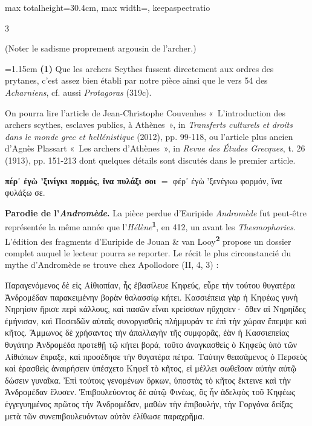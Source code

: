 \documentclass[11pt,twoside]{book}
\newcommand{\italique}[1]{\textit{#1}}
\newcommand{\citComm}[1]{\begin{quoting}[vskip=0.4pt,leftmargin=0.7em,rightmargin=0.2em]#1\end{quoting}}
\newcommand{\marqueur}[1]{\textsuperscript{\color{rubricRed}\textbf{#1}}}
\begin{document}
\begin{adjustbox}{max totalheight=30.4cm, max width=\textwidth, keepaspectratio}
\begin{minipage}{\textwidth}
{\begin{multicols}{3}
\par\vspace{1.5pt}
\noindent (Noter le sadisme proprement argousin de l'archer.)
\par\vspace{1.5pt}
\par\vspace{1.2pt}\par\nopagebreak\vspace{1pt}\noindent\hangindent=1.15em {\color{sepiaNote}\textbf{(1)}} Que les archers Scythes fussent directement aux ordres des prytanes, c'est assez bien établi par notre pièce ainsi que le vers 54 des \italique{Acharniens}, cf. aussi \italique{Protagoras} (319c).
\par\vspace{1.5pt}
\noindent On pourra lire l'article de Jean-Christophe Couvenhes «~L'introduction des archers scythes, esclaves publics, à Athènes~», in \italique{Transferts culturels et droits dans le monde grec et hellénistique} (2012), pp. 99-118, ou l'article plus ancien d'Agnès Plassart «~Les archers d'Athènes~», in \italique{Revue des Études Grecques}, t. 26 (1913), pp. 151-213 dont quelques détails sont discutés dans le premier article.
\par\vspace{1.5pt}
 \textbf{πέρ᾽ ἐγὼ 'ξινίγκι πορμός, ἴνα πυλάξι σοι} $=$ φέρ᾽ ἐγὼ 'ξενέγκω φορμόν, ἵνα φυλάξω σε.
\par\vspace{1.5pt}
 \textbf{Parodie de l'\italique{Andromède}.} La pièce perdue d'Euripide \italique{Andromède} fut peut-être représentée la même année que l'\italique{Hélène}\marqueur{1}, en 412, un avant les \italique{Thesmophories}. L'édition des fragments d'Euripide de Jouan \& van Looy\marqueur{2} propose un dossier complet auquel le lecteur pourra se reporter. Le récit le plus circonstancié du mythe d'Andromède se trouve chez Apollodore (II, 4, 3) :
\citComm{Παραγενόμενος δὲ εἰς Αἰθιοπίαν, ἧς ἐβασίλευε Κηφεύς, εὗρε τὴν τούτου θυγατέρα Ἀνδρομέδαν παρακειμένην βορὰν θαλασσίῳ κήτει. Κασσιέπεια γὰρ ἡ Κηφέως γυνὴ Νηρηίσιν ἤρισε περὶ κάλλους, καὶ πασῶν εἶναι κρείσσων ηὔχησεν· ὅθεν αἱ Νηρηίδες ἐμήνισαν, καὶ Ποσειδῶν αὐταῖς συνοργισθεὶς πλήμμυράν τε ἐπὶ τὴν χώραν ἔπεμψε καὶ κῆτος. Ἄμμωνος δὲ χρήσαντος τὴν ἀπαλλαγὴν τῆς συμφορᾶς, ἐὰν ἡ Κασσιεπείας θυγάτηρ Ἀνδρομέδα προτεθῇ τῷ κήτει βορά, τοῦτο ἀναγκασθεὶς ὁ Κηφεὺς ὑπὸ τῶν Αἰθιόπων ἔπραξε, καὶ προσέδησε τὴν θυγατέρα πέτρα. Ταύτην θεασάμενος ὁ Περσεὺς καὶ ἐρασθεὶς ἀναιρήσειν ὑπέσχετο Κηφεῖ τὸ κῆτος, εἰ μέλλει σωθεῖσαν αὐτὴν αὐτῷ δώσειν γυναῖκα. Ἐπὶ τούτοις γενομένων ὅρκων, ὑποστὰς τὸ κῆτος ἔκτεινε καὶ τὴν Ἀνδρομέδαν ἔλυσεν. Ἐπιβουλεύοντος δὲ αὐτῷ Φινέως, ὃς ἦν ἀδελφὸς τοῦ Κηφέως ἐγγεγυημένος πρῶτος τὴν Ἀνδρομέδαν, μαθὼν τὴν ἐπιβουλήν, τὴν Γοργόνα δείξας μετὰ τῶν συνεπιβουλευόντων αὐτὸν ἐλίθωσε παραχρῆμα.\\
}
\end{multicols}}
\end{minipage}
\end{adjustbox}
\end{document}
